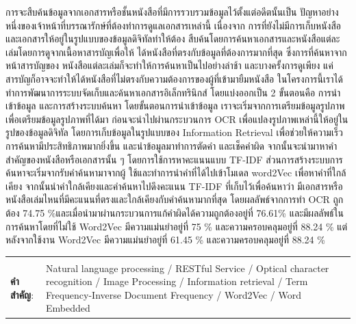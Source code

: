 \documentclass[12pt,oneside,openright,a4paper]{cpe-thai-project}
\begin{document}
\thaiabstract

การจะสืบค้นข้อมูลจากเอกสารหรือชั้นหนังสือที่มีการรวบรวมข้อมูลไว้ตั้งแต่อดีตนั้นเป็น
ปัญหาอย่างหนึ่งของเจ้าหน้าที่บรรณารักษ์ที่ต้องทำการดูแลเอกสารเหล่านี้ เนื่องจาก
การที่ยังไม่มีการเก็บหนังสือและเอกสารให้อยู่ในรูปแบบของข้อมูลดิจิทัลทำให้ต้อง
สืบค้นโดยการค้นหาเอกสารและหนังสือแต่ละเล่มโดยการดูจากเนื้อหาสารบัญเพื่อให้
ได้หนังสือที่ตรงกับข้อมูลที่ต้องการมากที่สุด ซึ่งการที่ค้นหาจากหน้าสารบัญของ
หนังสือแต่ละเล่มก็จะทำให้การค้นหาเป็นไปอย่างล่าช้า และบางครั้งการดูเพียง
แค่สารบัญก็อาจจะทำให้ได้หนังสือที่ไม่ตรงกับความต้องการของผู้ที่เข้ามายืมหนังสือ 
ในโครงการนี้เราได้ทำการพัฒนาการระบบจัดเก็บและค้นหาเอกสารอิเล็กทรินิกส์ 
โดยแบ่งออกเป็น 2 ขั้นตอนคือ การนำเข้าข้อมูล  และการสร้างระบบค้นหา 
โดยขั้นตอนการนำเข้าข้อมูล เราจะเริ่มจากการเตรียมข้อมูลรูปภาพ
เพื่อเตรียมข้อมูลรูปภาพที่ได้มา ก่อนจะนำไปผ่านกระบวนการ OCR 
เพื่อแปลงรูปภาพเหล่านี้ให้อยู่ในรูปของข้อมูลดิจิทัล โดยการเก็บข้อมูลในรูปแบบของ 
Information Retrieval เพื่อช่วยให้ความเร็วการค้นหามีประสิทธิภาพมากยิ่งขึ้น 
และนำข้อมูลมาทำการตัดคำ และเช็คคำผิด จากนั้นจะนำมาหาคำสำคัญของหนังสือหรือเอกสารนั้น ๆ
โดยการใช้การหาคะแนนแบบ TF-IDF ส่วนการสร้างระบบการค้นหาจะเริ่มจากรับคำค้นหามาจากผู้
ใช้และทำการนำคำที่ได้ไปเข้าโมเดล word2Vec เพื่อหาคำที่ใกล้เคียง 
จากนั้นนำคำใกล้เคียงและคำค้นหาไปดึงคะแนน TF-IDF ที่เก็บไว้เพื่อค้นหาว่า
มีเอกสารหรือหนังสือเล่มไหนที่มีคะแนนที่ตรงและใกล้เคียงกับคำค้นหามากที่สุด
โดยผลลัพธ์จากการทำ OCR ถูกต้อง 74.75 \%และเมื่อนำมาผ่านกระบวนการแก้คำผิดได้ความถูกต้องอยู่ที่ 76.61\%
และมีผลลัพธ์ในการค้นหาโดยที่ไม่ใช้ Word2Vec มีความแม่นยำอยู่ที่ 75 \% และความครอบคลุมอยู่ที่ 88.24 \% 
แต่หลังจากใช้งาน Word2Vec มีความแม่นยำอยู่ที่ 61.45 \% และความครอบคลุมอยู่ที่ 88.24 \%
\begin{flushleft}
\begin{tabular*}{\textwidth}{@{}lp{}}
 & \\

\textbf{คำสำคัญ}: & Natural language processing / RESTful Service / Optical character recognition / Image Processing / Information retrieval / Term Frequency-Inverse Document Frequency / Word2Vec / Word Embedded 
\end{tabular*}
\end{flushleft}
\endabstract
\end{document}
